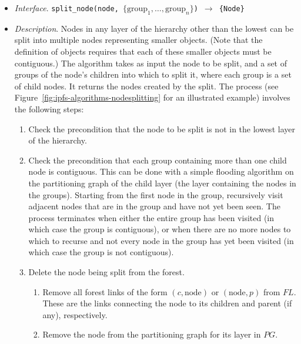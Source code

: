 \begin{itemize}

\item \emph{Interface}. \texttt{split_node(node, $\{\mbox{group}_1,\ldots,\mbox{group}_n\}$) $\rightarrow$ \{Node\}}

\item \emph{Description}. Nodes in any layer of the hierarchy other than the lowest can be split into multiple nodes representing smaller objects. (Note that the definition of objects requires that each of these smaller objects must be contiguous.) The algorithm takes as input the node to be split, and a set of groups of the node's children into which to split it, where each group is a set of child nodes. It returns the nodes created by the split. The process (see Figure~\ref{fig:ipfs-algorithms-nodesplitting} for an illustrated example) involves the following steps:

\begin{enumerate}

\item Check the precondition that the node to be split is not in the lowest layer of the hierarchy.

\item Check the precondition that each group containing more than one child node is contiguous. This can be done with a simple flooding algorithm on the partitioning graph of the child layer (the layer containing the nodes in the groups). Starting from the first node in the group, recursively visit adjacent nodes that are in the group and have not yet been seen. The process terminates when either the entire group has been visited (in which case the group is contiguous), or when there are no more nodes to which to recurse and not every node in the group has yet been visited (in which case the group is not contiguous).

\item Delete the node being split from the forest.

\begin{enumerate}

\item Remove all forest links of the form $(c,\mbox{node})$ or $(\mbox{node},p)$ from $\textit{FL}$. These are the links connecting the node to its children and parent (if any), respectively.

\item Remove the node from the partitioning graph for its layer in $\textit{PG}$.


\end{enumerate}
\end{enumerate}
\end{itemize}
